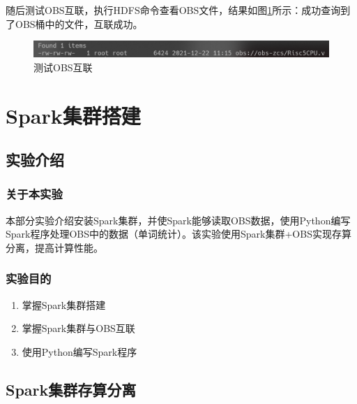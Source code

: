 \documentclass{../source/zjureport}
\begin{document}
                随后测试OBS互联，执行HDFS命令查看OBS文件，结果如图\ref{OBS互联}所示：成功查询到了OBS桶中的文件，互联成功。
                \begin{figure}[H]
                    \centering
                    \includegraphics[width = \textwidth]{figure/Hadoop集群与OBS互联成功.png}
                    \caption{测试OBS互联}
                    \label{OBS互联}
                \end{figure}
        
    \section{Spark集群搭建}
        \subsection{实验介绍}
            \subsubsection{关于本实验}
                本部分实验介绍安装Spark集群，并使Spark能够读取OBS数据，使用Python编写Spark程序处理OBS中的数据（单词统计）。该实验使用Spark集群+OBS实现存算分离，提高计算性能。
            \subsubsection{实验目的}
                \begin{enumerate}
                    \item 掌握Spark集群搭建
                    \item 掌握Spark集群与OBS互联
                    \item 使用Python编写Spark程序
                \end{enumerate}
        \subsection{Spark集群存算分离}
\end{document}
